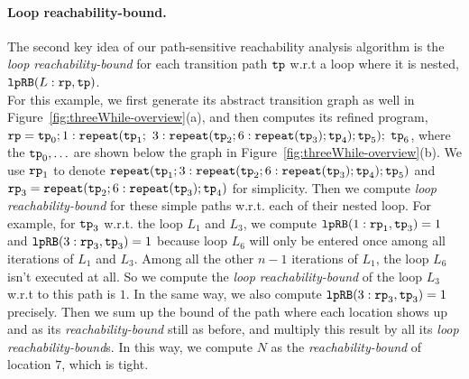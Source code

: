 \paragraph*{Loop reachability-bound.}
The second key idea of our path-sensitive reachability analysis algorithm is the
\emph{loop reachability-bound} for each transition path $\mathtt{tp}$ w.r.t a loop where it is nested,
$\mathtt{lpRB}(L:\mathtt{rp}, \mathtt{tp})$.
\\
For this example, we first generate its abstract transition graph as well in Figure~\ref{fig:threeWhile-overview}(a),
and then computes its refined program,
$\mathtt{rp} = \mathtt{tp}_0; 1: \mathtt{repeat}(\mathtt{tp}_1;$ 
$3: {\mathtt{repeat}(\mathtt{tp}_2; 6 : {\mathtt{repeat}(\mathtt{tp}_3)}; \mathtt{tp}_4)}; \mathtt{tp}_5);$ 
$\mathtt{tp}_6$,
where the $\mathtt{tp}_0, \ldots$ are shown below the graph in Figure~\ref{fig:threeWhile-overview}(b).
We use $\mathtt{rp}_1$ to denote ${\mathtt{repeat}(\mathtt{tp}_1; 3: {\mathtt{repeat}(\mathtt{tp}_2; 6 : {\mathtt{repeat}(\mathtt{tp}_3)}; \mathtt{tp}_4)}; \mathtt{tp}_5)}$
and $\mathtt{rp}_3 = {\mathtt{repeat}(\mathtt{tp}_2; 6 : {\mathtt{repeat}(\mathtt{tp}_3)}; \mathtt{tp}_4)}$
for simplicity.
Then we compute \emph{loop reachability-bound} for these simple paths w.r.t. each of their nested loop.
For example, for $\mathtt{tp}_3$ w.r.t. the loop $L_1$ and $L_3$, we compute
$\mathtt{lpRB}(1: \mathtt{rp}_1, \mathtt{tp}_3) = 1$ and
$\mathtt{lpRB}(3: \mathtt{rp}_3, \mathtt{tp}_3) = 1$ because loop $L_6$ will only be entered once among all iterations of $L_1$ and $L_3$.
Among all the other $n - 1$ iterations of $L_1$, the loop $L_6$ isn't executed at all.
So we compute the \emph{loop reachability-bound}  of the loop $L_3$
w.r.t to this path is $1$.
In the same way, we also compute $\mathtt{lpRB}(3: \mathtt{rp}_3, \mathtt{tp}_3) = 1$ precisely.
Then we sum up the bound of the path where each location shows up
and as its \emph{reachability-bound} still as before,
and multiply this result by all its \emph{loop reachability-bound}s.
In this way, we compute $N$ as the \emph{reachability-bound} of location $7$, which is tight.

